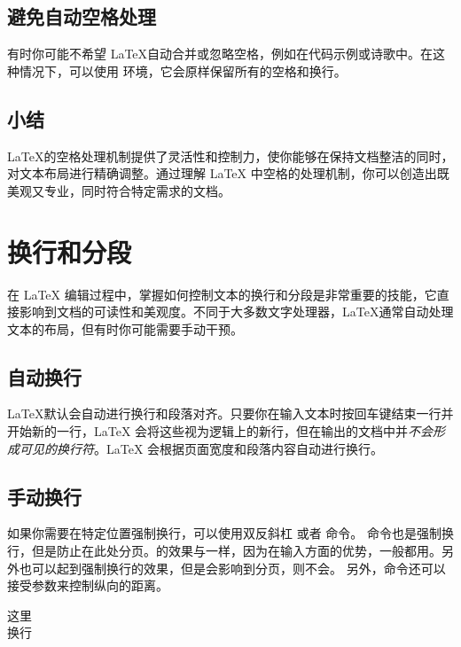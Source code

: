 {{{\subsection{避免自动空格处理}
有时你可能不希望 \LaTeX 自动合并或忽略空格，例如在代码示例或诗歌中。在这种情况下，可以使用  环境，它会原样保留所有的空格和换行。

\subsection{小结}
\LaTeX 的空格处理机制提供了灵活性和控制力，使你能够在保持文档整洁的同时，对文本布局进行精确调整。通过理解 \LaTeX
中空格的处理机制，你可以创造出既美观又专业，同时符合特定需求的文档。

\section{换行和分段}
在 \LaTeX
编辑过程中，掌握如何控制文本的换行和分段是非常重要的技能，它直接影响到文档的可读性和美观度。不同于大多数文字处理器，\LaTeX 通常自动处理文本的布局，但有时你可能需要手动干预。
\subsection{自动换行}
\LaTeX 默认会自动进行换行和段落对齐。只要你在输入文本时按回车键结束一行并开始新的一行，\LaTeX
会将这些视为逻辑上的新行，但在输出的文档中并\emph{不会形成可见的换行符}。LaTeX 会根据页面宽度和段落内容自动进行换行。

\subsection{手动换行}
如果你需要在特定位置强制换行，可以使用双反斜杠 \texinline{\\} 或者 \texinline{\newline} 命令。
\texinline{\\*}命令也是强制换行，但是防止在此处分页。\texinline{\newline}的效果与\texinline{\\}一样，因为\texinline{\\}在输入方面的优势，一般都用\texinline{\\}。另外\texinline{\linebreak}也可以起到强制换行的效果，但是\texinline{\linebreak}会影响到分页，\texinline{\newline}则不会。
另外，\texinline{\\}命令还可以接受参数来控制纵向的距离。
\begin{texlst}
	这里\\换行


\end{texlst}}}}

